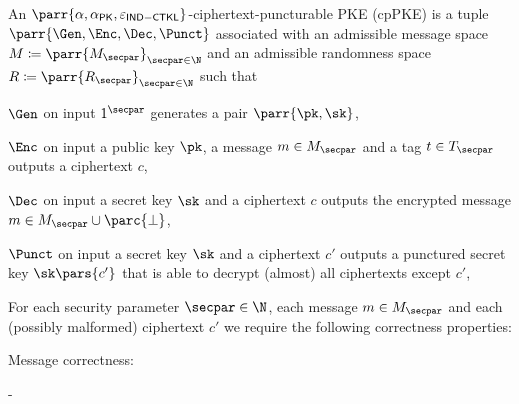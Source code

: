 \begin{definition}
    An \(\parr{\alpha,\alpha_{\mathsf{PK}},\varepsilon_{\mathsf{IND-CTKL}}}\)-ciphertext-puncturable PKE (cpPKE) is a tuple \(\parr{\Gen,\Enc,\Dec,\Punct}\) associated with an admissible message space \(M \coloneqq \parr{M_\secpar}_{\secpar \in \N}\) and
    an admissible randomness space \(R \coloneqq \parr{R_\secpar}_{\secpar \in \N}\) such that
    \begin{sitemize}
        \item \(\Gen\) on input \(1^\secpar\) generates a pair \(\parr{\pk,\sk}\),
        \item \(\Enc\) on input a public key \(\pk\), a message \(m \in M_\secpar\) and a tag \(t \in T_\secpar\) outputs a ciphertext \(c\),
        \item \(\Dec\) on input a secret key \(\sk\) and a ciphertext \(c\) outputs the encrypted message \(m \in M_\secpar \cup \parc{\bot}\),
        \item \(\Punct\) on input a secret key \(\sk\) and a ciphertext \(c'\) outputs a punctured secret key \(\sk\pars{c'}\) that is able to decrypt (almost) all ciphertexts except \(c'\),
    \end{sitemize}
    For each security parameter \(\secpar \in \N\),
    each message \(m \in M_\secpar\) and
    each (possibly malformed) ciphertext \(c'\) we require the following correctness properties:
    \begin{sitemize}
        \item Message correctness:
        \begin{bralign}
             - \alpha\parr{\secpar}
        \end{bralign}


\end{sitemize}
\end{definition}
